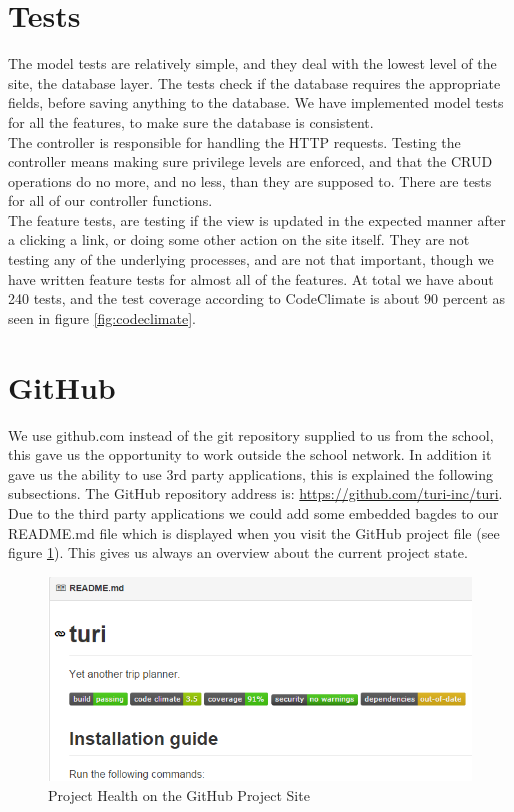 \documentclass[a4paper]{article}
\begin{document}
\section{Tests}
\noindent
The model tests are relatively simple, and they deal with the lowest level of the site, the database layer. The tests check if the database requires the appropriate fields, before saving anything to the database. We have implemented model tests for all the features, to make sure the database is consistent.
\\

\noindent
The controller is responsible for handling the HTTP requests. Testing the controller means making sure privilege levels are enforced, and that the CRUD operations do no more, and no less, than they are supposed to. There are tests for all of our controller functions.
\\

\noindent
The feature tests, are testing if the view is updated in the expected manner after a clicking a link, or doing some other action on the site itself. They are not testing any of the underlying processes, and are not that important, though we have written feature tests for almost all of the features. 
At total we have about 240 tests, and the test coverage according to CodeClimate is about 90 percent as seen in figure \ref{fig:codeclimate}.
\\

\section{GitHub}
We use github.com instead of the git repository supplied to us from the school, this gave us the opportunity to work outside the school network. In addition it gave us the ability to use 3rd party applications, this is explained the following subsections. The GitHub repository address is: \url{https://github.com/turi-inc/turi}. Due to the third party applications we could add some embedded bagdes to our README.md file which is displayed when you visit the GitHub project file (see figure \ref{fig:badges}). This gives us always an overview about the current project state.

\begin{figure}[!h]
  \begin{center}
    \includegraphics[scale=0.7]{pictures/badges.png}
    \caption{Project Health on the GitHub Project Site}
    \label{fig:badges}
  \end{center}
\end{figure}
\end{document}
